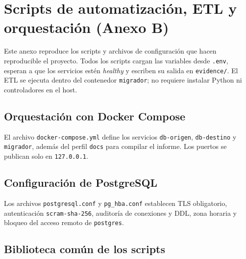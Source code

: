 
\section{Scripts de automatización, ETL y orquestación (Anexo B)}

Este anexo reproduce los scripts y archivos de configuración que hacen
reproducible el proyecto. Todos los scripts cargan las variables desde
\texttt{.env}, esperan a que los servicios estén \emph{healthy} y escriben su
salida en \texttt{evidence/}. El ETL se ejecuta dentro del contenedor
\texttt{migrador}; no requiere instalar Python ni controladores en el host.

\subsection{Orquestación con Docker Compose}

El archivo \texttt{docker-compose.yml} define los servicios
\texttt{db-origen}, \texttt{db-destino} y \texttt{migrador}, además del perfil
\texttt{docs} para compilar el informe. Los puertos se publican solo en
\texttt{127.0.0.1}.



\subsection{Configuración de PostgreSQL}

Los archivos \texttt{postgresql.conf} y \texttt{pg\_hba.conf} establecen TLS
obligatorio, autenticación \texttt{scram-sha-256}, auditoría de conexiones y
DDL, zona horaria y bloqueo del acceso remoto de \texttt{postgres}.





\subsection{Biblioteca común de los scripts}

